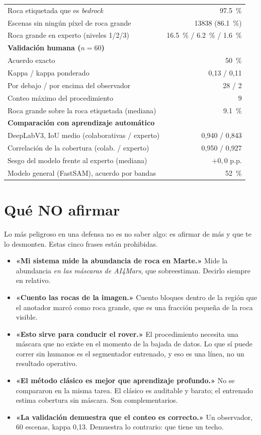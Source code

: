 \documentclass[11pt]{article}
\begin{document}
\begin{table}[h]
\begin{tabular}{lr}
Roca etiquetada que es \textit{bedrock} & \SI{97.5}{\percent}\\
Escenas sin ningún píxel de roca grande & \num{13838} (\SI{86.1}{\percent})\\
Roca grande en experto (niveles 1/2/3) & \SI{16.5}{\percent} / \SI{6.2}{\percent} / \SI{1.6}{\percent}\\
\midrule
\multicolumn{2}{l}{\textbf{Validación humana ($n = 60$)}}\\
Acuerdo exacto & \SI{50}{\percent}\\
Kappa / kappa ponderado & 0,13 / 0,11\\
Por debajo / por encima del observador & 28 / 2\\
Conteo máximo del procedimiento & 9\\
Roca grande sobre la roca etiquetada (mediana) & \SI{9.1}{\percent}\\
\midrule
\multicolumn{2}{l}{\textbf{Comparación con aprendizaje automático}}\\
DeepLabV3, IoU medio (colaborativas / experto) & 0,940 / 0,843\\
Correlación de la cobertura (colab. / experto) & 0,950 / 0,927\\
Sesgo del modelo frente al experto (mediana) & $+0{,}0$ p.p.\\
Modelo general (FastSAM), acuerdo por bandas & \SI{52}{\percent}\\
\bottomrule
\end{tabular}
\end{table}

\section{Qué NO afirmar}

Lo más peligroso en una defensa no es no saber algo: es afirmar de más y que te lo
desmonten. Estas cinco frases están prohibidas.

\begin{itemize}\itemsep3pt
  \item \textbf{«Mi sistema mide la abundancia de roca en Marte.»} Mide la abundancia
    \emph{en las máscaras de AI4Mars}, que sobreestiman. Decirlo siempre en relativo.
  \item \textbf{«Cuento las rocas de la imagen.»} Cuento bloques dentro de la región que el
    anotador marcó como roca grande, que es una fracción pequeña de la roca visible.
  \item \textbf{«Esto sirve para conducir el rover.»} El procedimiento necesita una máscara
    que no existe en el momento de la bajada de datos. Lo que sí puede correr sin humanos
    es el segmentador entrenado, y eso es una línea, no un resultado operativo.
  \item \textbf{«El método clásico es mejor que aprendizaje profundo.»} No se compararon en
    la misma tarea. El clásico es auditable y barato; el entrenado estima cobertura sin
    máscara. Son complementarios.
  \item \textbf{«La validación demuestra que el conteo es correcto.»} Un observador,
    \num{60} escenas, kappa 0,13. Demuestra lo contrario: que tiene un techo.
\end{itemize}
\end{document}

